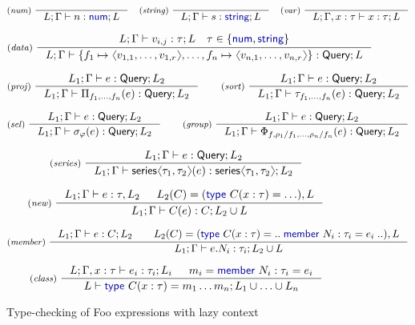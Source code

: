\documentclass[a4paper,UKenglish]{lipics-v2016}
\theoremstyle{plain}
\theoremstyle{definition}
\newcommand{\vect}[1]{\langl #1 \rangl}
\newcommand{\langl}{\begin{picture}(4.5,7)
\put(1.1,2.5){\rotatebox{60}{\line(1,0){5.5}}}
\put(1.1,2.5){\rotatebox{300}{\line(1,0){5.5}}}
\end{picture}}
\newcommand{\rangl}{\begin{picture}(4.5,7)
\put(.9,2.5){\rotatebox{120}{\line(1,0){5.5}}}
\put(.9,2.5){\rotatebox{240}{\line(1,0){5.5}}}
\end{picture}}
\newcommand{\kvd}[1]{\textnormal{\textcolor{kvdclr}{\sffamily #1}}}
\newcommand{\ident}[1]{\textnormal{\sffamily #1}}
\begin{document}
\begin{figure}[t]

\[
\inference[(\emph{num})~]{}{L; \Gamma \vdash n : \kvd{num}; L }
\quad
\inference[(\emph{string})~]{}{L; \Gamma \vdash s : \kvd{string}; L}
\quad
\inference[(\emph{var})~]{}{L; \Gamma, x:\tau\vdash x:\tau; L}
\]
\vspace{-2em}

\[
\inference[(\emph{data})~]
  {L; \Gamma \vdash v_{i,j} : \tau;L \quad \tau \in \{ \kvd{num}, \kvd{string} \}}
  {L; \Gamma \vdash \{f_1\mapsto \vect{v_{1,1},\ldots,v_{1,r}}, \ldots, f_n\mapsto \vect{v_{n,1},\ldots,v_{n,r}}\} : \ident{Query};L }
\]
\vspace{-2em}

\[
\inference[(\emph{proj})~]
  {L_1; \Gamma\vdash e : \ident{Query}; L_2}
  {L_1; \Gamma\vdash \Pi_{f_1, \ldots, f_n} (e) : \ident{Query}; L_2}
\qquad\inference[(\emph{sort})~]
  {L_1; \Gamma\vdash e : \ident{Query}; L_2}
  {L_1; \Gamma\vdash \tau_{f_1, \ldots, f_n}(e): \ident{Query}; L_2}
\]

\[
\inference[(\emph{sel})~]
  {L_1; \Gamma\vdash e : \ident{Query}; L_2}
  {L_1; \Gamma\vdash \sigma_\varphi (e) : \ident{Query}; L_2}
\qquad
\inference[(\emph{group})~]
  {L_1; \Gamma\vdash e : \ident{Query}; L_2}
  {L_1; \Gamma\vdash \Phi_{f, \rho_1/f_1, \ldots, \rho_n/f_n}(e): \ident{Query}; L_2}
\]
\vspace{-2em}

\[
\inference[(\emph{series})~]
  {L_1; \Gamma\vdash e : \ident{Query}; L_2}
  {L_1; \Gamma\vdash \ident{series}\langl \tau_1, \tau_2 \rangl(e) : \ident{series}\langl \tau_1, \tau_2 \rangl; L_2}
\]
\vspace{-2em}

\[
\inference[(\emph{new})~]
  {L_1; \Gamma \vdash e : \tau, L_2 & L_2(C) = (\kvd{type}~C(x:\tau) = \ldots), L}
  {L_1; \Gamma \vdash C(e) : C; L_2 \cup L}
\]
\vspace{-2em}

\[
\inference[(\emph{member})~]
  {L_1; \Gamma \vdash e : C; L_2 \qquad L_2(C)=(\kvd{type}~C(x:\tau) = ..\;\kvd{member}~N_i : \tau_i = e_i\;..), L}
  {L_1; \Gamma \vdash e.N_i:\tau_i; L_2 \cup L}
\]
\vspace{-2em}

\[
\inference[(\emph{class})~]
  { L; \Gamma,x:\tau \vdash e_i : \tau_i; L_{i} & m_i = \kvd{member}~N_i:\tau_i= e_i }
  { L \vdash \kvd{type}~C(x:\tau) = m_1\ldots m_n; L_1 \cup \ldots \cup L_n }
\]
\caption{Type-checking of Foo expressions with lazy context}
\label{fig:foo-typecheck}
\end{figure}
\end{document}
